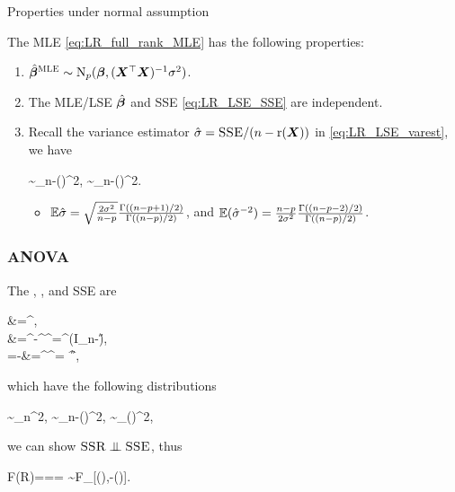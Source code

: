\documentclass[10pt,a4paper]{book}
\begin{document}
\begin{thmbox}{Properties under normal assumption}
	\begin{proposition}\label{prop:LR_full_rank_normal_prop} The MLE \eqref{eq:LR_full_rank_MLE} has the following properties:
		\begin{enumerate}
			\item $\hat{{\boldsymbol\beta}}^{\textsc{MLE}}\sim\mathrm{N}_p({\boldsymbol\beta},({\boldsymbol X}^\top{\boldsymbol X})^{-1}\sigma^2)$. 
			\item The MLE/LSE $\hat{{\boldsymbol\beta}}$ and SSE \eqref{eq:LR_LSE_SSE} are independent.
			\item Recall the variance estimator $\hat{\sigma}=\textsc{SSE}/(n-\mathrm{r}({\boldsymbol X}))$ in \eqref{eq:LR_LSE_varest}, we have \begin{salign*}
				\sim\chi_{n-\rmr(\X)}^2, \quad {} \quad {}\sim\chi_{n-\rmr(\X)}^2.
			\end{salign*}
			\begin{itemize}
				\item $\mathbb E\hat{\sigma}=\sqrt{\frac{2\sigma^2}{n-p}}\frac{\Gamma((n-p+1)/2)}{\Gamma((n-p)/2)}$, and $\mathbb E(\hat{\sigma}^{-2})=\frac{n-p}{2\sigma^2}\frac{\Gamma((n-p-2)/2)}{\Gamma((n-p)/2)}$.
			\end{itemize}
		\end{enumerate}
	\end{proposition}
\end{thmbox}

\subsubsection{ANOVA}\label{sec:LR_full_rank_normal_ANOVA}

The , , and SSE are 
\begin{salign*}
	\SST&=\Y^\TT\Y,\\
	\SSE&=\Y^\TT\Y-\hat{\bab}^\TT\X^\TT\Y=\Y^\TT (I_n-\H)\Y,\\
	\SSR=\SST-\SSE&=\hat{\bab}^\TT\X^\TT\Y= \Y^\TT\H\Y,
\end{salign*}
which have the following distributions
\begin{salign*}
	\sim\chi_{n}^2, \quad 
	\sim\chi_{n-\rmr(\X)}^2, \quad
	\sim\chi_{\rmr(\X)}^2, 
\end{salign*}
we can show $\SSR\indep\SSE$, thus
\begin{salign*}
	F(R)=\frac{\MSR}{\MSE}== \sim \textsc{F}_{[\rmr(\X),\n-\rmr(\X)]}.
\end{salign*}
\end{document}

